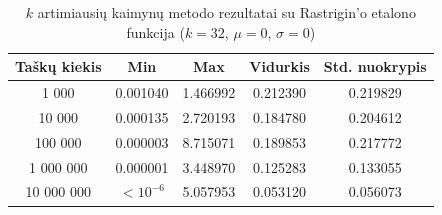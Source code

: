 \begin{table}[H]
    \centering
    \begin{tabular}{|c|c|c|c|c|}
        \hline
        \textbf{Taškų kiekis} & \textbf{Min} & \textbf{Max} & \textbf{Vidurkis} & \textbf{Std. nuokrypis} \\ \hline
        1 000        & 0.001040 & 1.466992 & 0.212390 & 0.219829 \\ \hline
        10 000       & 0.000135 & 2.720193 & 0.184780 & 0.204612 \\ \hline
        100 000      & 0.000003 & 8.715071 & 0.189853 & 0.217772 \\ \hline
        1 000 000    & 0.000001 & 3.448970 & 0.125283 & 0.133055 \\ \hline
        10 000 000   & $<10^{-6}$ & 5.057953 & 0.053120 & 0.056073 \\ \hline
    \end{tabular}
    \caption{$k$ artimiausių kaimynų metodo rezultatai su Rastrigin'o etalono funkcija ($k = 32$, $\mu = 0$, $\sigma = 0$)}
\end{table}